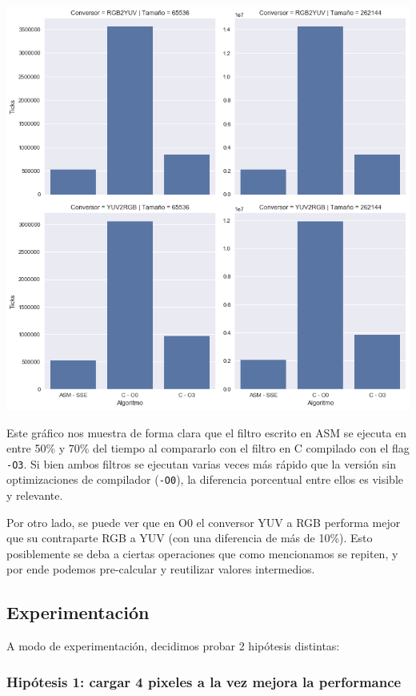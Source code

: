 \begin{center}
	\includegraphics[scale=0.5]{img/conversores_CvsASMvsO3_bars.png}
\end{center}

Este gráfico nos muestra de forma clara que el filtro escrito en ASM se ejecuta en entre 50\% y 70\% del tiempo al compararlo con el filtro en C compilado con el flag \texttt{-O3}. Si bien ambos filtros se ejecutan varias veces más rápido que la versión sin optimizaciones de compilador (\texttt{-O0}), la diferencia porcentual entre ellos es visible y relevante.

Por otro lado, se puede ver que en O0 el conversor YUV a RGB performa mejor que su contraparte RGB a YUV (con una diferencia de más de 10\%). Esto posiblemente se deba a ciertas operaciones que como mencionamos se repiten, y por ende podemos pre-calcular y reutilizar valores intermedios.

\subsection{Experimentación}

A modo de experimentación, decidimos probar 2 hipótesis distintas:

\subsubsection*{Hipótesis 1: cargar 4 pixeles a la vez mejora la performance}

